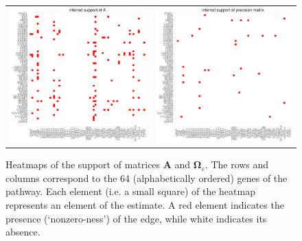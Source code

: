 \begin{figure}[h!]
\centering
\begin{tabular}{cc}
\includegraphics[scale=0.3]{Ahat_support.eps}
&
\includegraphics[scale=0.3]{Phat_support.eps}
\end{tabular}
\caption{Heatmaps of the support of matrices $\mathbf{A}$ and $\mathbf{\Omega}_{\varepsilon}$. The rows and columns correspond to the 64 (alphabetically ordered) genes of the pathway. Each element (i.e. a small square) of the heatmap represents an element of the estimate. A red element indicates the presence (`nonzero-ness') of the edge, while white indicates its absence.
}
\label{figSM:support}
\end{figure}


